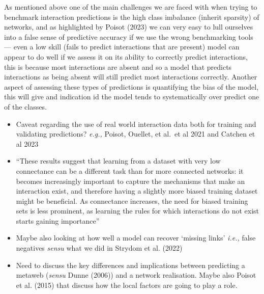 \documentclass[
]{article}
\begin{document}
As mentioned above one of the main challenges we are faced with when
trying to benchmark interaction predictions is the high class imbalance
(inherit sparsity) of networks, and as highlighted by Poisot (2023) we
can very easy to lull ourselves into a false sense of predictive
accuracy if we use the wrong benchmarking tools --- even a low skill
(fails to predict interactions that are present) model can appear to do
well if we assess it on its ability to correctly predict interactions,
this is because most interactions are absent and so a model that
predicts interactions as being absent will still predict most
interactions correctly. Another aspect of assessing these types of
predictions is quantifying the bias of the model, this will give and
indication id the model tends to systematically over predict one of the
classes.

\begin{itemize}
\item
  Caveat regarding the use of real world interaction data both for
  training and validating predictions? \emph{e.g.,} Poisot, Ouellet, et
  al.~et al 2021 and Catchen et al 2023
\item
  ``These results suggest that learning from a dataset with very low
  connectance can be a different task than for more connected networks:
  it becomes increasingly important to capture the mechanisms that make
  an interaction exist, and therefore having a slightly more biased
  training dataset might be beneficial. As connectance increases, the
  need for biased training sets is less prominent, as learning the rules
  for which interactions do not exist starts gaining importance''
\item
  Maybe also looking at how well a model can recover `missing links'
  \emph{i.e.,} false negatives \emph{sensu} what we did in Strydom et
  al. (2022)
\item
  Need to discuss the key differences and implications between
  predicting a metaweb (\emph{sensu} Dunne (2006)) and a network
  realisation. Maybe also Poisot et al. (2015) that discuss how the
  local factors are going to play a role.
\end{itemize}
\end{document}
